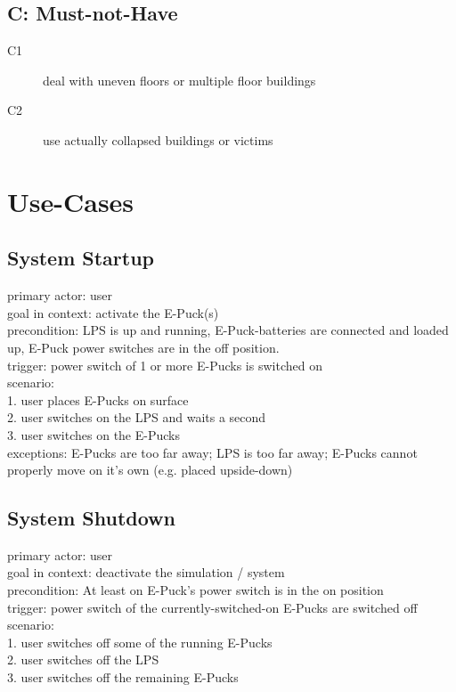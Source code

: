 \documentclass[a4paper,parskip,headheight=38pt]{scrartcl} %
\begin{document}
\subsection*{C: Must-not-Have}
\begin{description}
\item[C1] deal with uneven floors or multiple floor buildings
\item[C2] use actually collapsed buildings or victims
\end{description}


\section{Use-Cases}
\subsection{System Startup}
primary actor: user \\
goal in context: activate the E-Puck(s) \\
precondition: LPS is up and running, E-Puck-batteries are connected and loaded up, E-Puck power switches are in the off position. \\
trigger: power switch of 1 or more E-Pucks is switched on \\
scenario: \\
1. user places E-Pucks on surface \\
2. user switches on the LPS and waits a second \\
3. user switches on the E-Pucks \\
exceptions: E-Pucks are too far away; LPS is too far away; E-Pucks cannot properly move on it's own (e.g. placed upside-down) \\

\subsection{System Shutdown}
primary actor: user \\
goal in context: deactivate the simulation / system \\
precondition: At least on E-Puck's power switch is in the on position \\
trigger: power switch of the currently-switched-on E-Pucks are switched off \\
scenario: \\
1. user switches off some of the running E-Pucks \\
2. user switches off the LPS \\
3. user switches off the remaining E-Pucks \\
\end{document}

